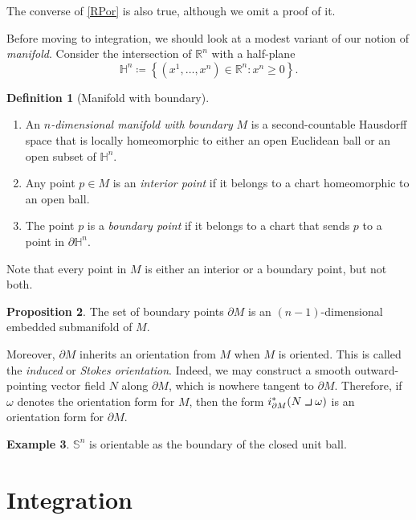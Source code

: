 \documentclass[10pt,letterpaper,cm]{nupset}
\theoremstyle{definition}
\newtheorem{definition}{Definition}[subsection]
\newtheorem{exmp}[definition]{Example}
\theoremstyle{theorem}
\newtheorem{prop}[definition]{Proposition}
\theoremstyle{remark}
\renewcommand{\H}{\mathbb H}
\newcommand{\R}{\mathbb R}
\renewcommand{\S}{\mathbb S}
\newcommand{\1}{\mathbf{1}}
\newcommand{\0}{\vec 0}
\newcommand{\intprodl}{%
    \mathbin{\scalebox{1.5}{$\lrcorner$}}%
}
\begin{document}
The converse of \cref{RPor} is also true, although we omit a proof of it.

\bigskip



Before moving to integration, we should look at a modest variant of our notion of \textit{manifold}. Consider the intersection of $\R^n$ with a half-plane 
$$\H^n\coloneqq  \left\{\left(x^1, \ldots, x^n\right) \in \R^n : x^n \geq 0\right\}.$$


\begin{definition}[Manifold with boundary] $ $
\begin{enumerate}
\item An \textit{$n$-dimensional manifold with boundary} $M$ is a second-countable Hausdorff space that is locally homeomorphic to either an open Euclidean ball or an open subset of $\H^n$. 
\item Any point $p\in M$ is an \textit{interior point} if it belongs to a chart homeomorphic to an open ball. 
\item The  point $p$ is  a \textit{boundary point} if it belongs to a chart that sends $p$ to a point in $\partial{\H^n}$.
\end{enumerate}
\end{definition}


Note that every point in $M$ is either an interior or a boundary point, but not both.


\begin{prop}
The set of boundary points $\partial{M}$ is an $\left(n-1\right)$-dimensional embedded submanifold of $M$.
\end{prop}


Moreover, $\partial{M}$ inherits an orientation from $M$ when $M$ is oriented. This is called the \textit{induced} or \textit{Stokes orientation}. Indeed, we may construct a smooth  outward-pointing vector field $N$ along $\partial{M}$, which is nowhere tangent to $\partial{M}$. Therefore,  if $\omega$ denotes the orientation form for $M$, then the form $i^{\ast}_{\partial{M}}(N \intprodl \omega)$ is an orientation form for $\partial{M}$.


\begin{exmp}
$\S^n$ is orientable as the boundary of the closed unit ball.
\end{exmp}

\section{Integration}
\end{document}
